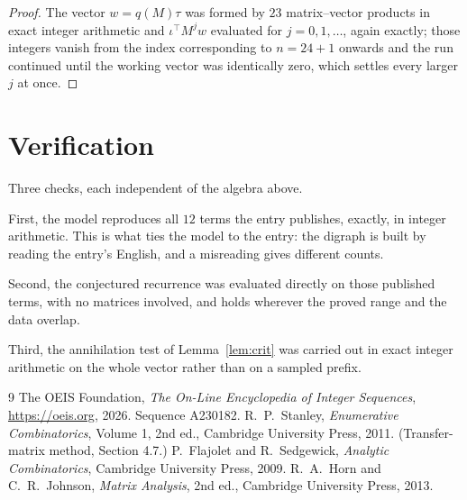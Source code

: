 \documentclass[11pt,a4paper]{article}
\theoremstyle{plain}
\theoremstyle{definition}
\begin{document}
\begin{proof}
The vector $w=q(M)\tau$ was formed by $23$ matrix--vector products in exact integer
arithmetic and $\iota^{\!\top}M^{j}w$ evaluated for $j=0,1,\dots$, again exactly; those
integers vanish from the index corresponding to $n=24+1$ onwards and the run continued
until the working vector was identically zero, which settles every larger $j$ at once.
\end{proof}

\section{Verification}

Three checks, each independent of the algebra above.

First, the model reproduces all $12$ terms the entry publishes, exactly, in integer
arithmetic. This is what ties the model to the entry: the digraph is built by reading the
entry's English, and a misreading gives different counts.

Second, the conjectured recurrence was evaluated directly on those published terms, with no
matrices involved, and holds wherever the proved range and the data overlap.

Third, the annihilation test of Lemma~\ref{lem:crit} was carried out in exact integer
arithmetic on the whole vector rather than on a sampled prefix.

\begin{thebibliography}{9}
 The OEIS Foundation, \emph{The On-Line Encyclopedia of Integer
Sequences}, \url{https://oeis.org}, 2026. Sequence A230182.
 R.~P.~Stanley, \emph{Enumerative Combinatorics}, Volume 1, 2nd ed.,
Cambridge University Press, 2011. (Transfer-matrix method, Section 4.7.)
 P.~Flajolet and R.~Sedgewick, \emph{Analytic Combinatorics}, Cambridge
University Press, 2009.
 R.~A.~Horn and C.~R.~Johnson, \emph{Matrix Analysis}, 2nd ed., Cambridge
University Press, 2013.
\end{thebibliography}
\end{document}
